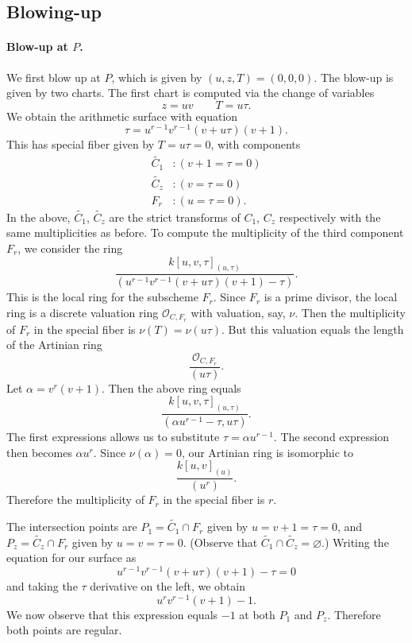 \documentclass{article}
\theoremstyle{plain}
\theoremstyle{definition}
\theoremstyle{remark}
\renewcommand{\emptyset}{\varnothing}
\renewcommand{\tilde}[1]{\widetilde{#1}}
\newcommand{\sO}{\ensuremath{\mathscr{O}}}
\begin{document}
\subsection{Blowing-up}
\label{sec:blowing-up}

\paragraph{Blow-up at $P$.}
\label{sec:blow-up-P}

We first blow up at $P$, which is given by $(u,z,T) = (0,0,0)$. The blow-up is given by two charts. The first chart is computed via the change of variables
\[
z = uv \qquad T = u\tau.
\]
We obtain the arithmetic surface with equation
\[
\tau = u^{r-1}v^{r-1}(v + u\tau)(v + 1).
\]
This has special fiber given by $T = u\tau = 0$, with components
\begin{align*}
  \tilde{C_1}&: (v + 1 = \tau = 0) \\
  \tilde{C_z}&: (v = \tau = 0) \\
  F_r&: (u = \tau = 0).
\end{align*}
In the above, $\tilde{C_1}$, $\tilde{C_z}$ are the strict transforms of $C_1$, $C_z$ respectively with the same multiplicities as before. To compute the multiplicity of the third component $F_r$, we consider the ring
\[
\frac{k[u,v,\tau]_{(u,\tau)}}{(u^{r-1}v^{r-1}(v + u\tau)(v + 1) - \tau)}.
\]
This is the local ring for the subscheme $F_r$. Since $F_r$ is a prime divisor, the local ring is a discrete valuation ring $\sO_{C,F_r}$ with valuation, say, $\nu$. Then the multiplicity of $F_r$ in the special fiber is $\nu(T) = \nu(u\tau)$. But this valuation equals the length of the Artinian ring
\[
\frac{\sO_{C,F_r}}{(u\tau)}.
\]
Let $\alpha = v^{r}(v+1)$. Then the above ring equals
\[
\frac{k[u,v,\tau]_{(u,\tau)}}{(\alpha u^{r-1} - \tau, u\tau)}.
\]
The first expressions allows us to substitute $\tau = \alpha u^{r-1}$. The second expression then becomes $\alpha u^r$. Since $\nu(\alpha) = 0$, our Artinian ring is isomorphic to
\[
\frac{k[u,v]_{(u)}}{(u^r)}.
\]
Therefore the multiplicity of $F_r$ in the special fiber is $r$.

The intersection points are $P_1 = \tilde{C_1} \cap F_r$ given by $u=v+1=\tau=0$, and $P_z = \tilde{C_z} \cap F_r$ given by $u=v=\tau=0$. (Observe that $\tilde{C_1} \cap \tilde{C_z} = \emptyset$.) Writing the equation for our surface as
\[
u^{r-1}v^{r-1}(v + u\tau)(v + 1) - \tau = 0
\]
and taking the $\tau$ derivative on the left, we obtain
\[
u^rv^{r-1}(v + 1) - 1.
\]
We now observe that this expression equals $-1$ at both $P_1$ and $P_z$. Therefore both points are regular.
\end{document}
